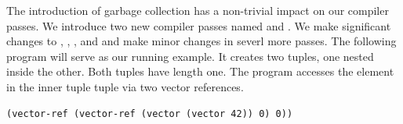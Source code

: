 \documentclass[11pt]{book}
\newtheorem{exercise}[theorem]{Exercise}
\begin{document}



The introduction of garbage collection has a non-trivial impact on our
compiler passes. We introduce two new compiler passes named
 and . We make
significant changes to ,
, , and
 and make minor changes in severl more passes.  The
following program will serve as our running example.  It creates two
tuples, one nested inside the other. Both tuples have length one. The
program accesses the element in the inner tuple tuple via two vector
references.
\begin{lstlisting}
(vector-ref (vector-ref (vector (vector 42)) 0) 0))
\end{lstlisting}
\end{document}
